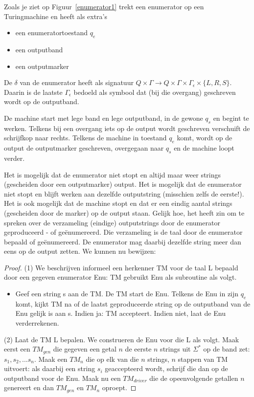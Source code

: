 Zoals je ziet op Figuur~\ref{enumerator1} trekt een enumerator op een
Turingmachine en heeft als extra's
\begin{itemize}
\item een enumeratortoestand $q_e$
\item een outputband
\item een outputmarker
\end{itemize}
De $\delta$ van de enumerator heeft als signatuur 
%
$Q \times \Gamma \rightarrow Q \times \Gamma \times \Gamma_\epsilon \times \{L,R,S\}$.
Daarin is de laatste $\Gamma_\epsilon$ bedoeld als symbool dat (bij die
overgang) geschreven wordt op de outputband.


De machine start met lege band en lege outputband, in de gewone $q_s$ en
begint te werken. Telkens bij een overgang iets op de output wordt
geschreven verschuift de schrijfkop naar rechts. Telkens de machine in
toestand $q_e$ komt, wordt op de output de outputmarker geschreven,
overgegaan naar $q_s$ en de machine loopt verder.


Het is mogelijk dat de enumerator niet stopt en altijd maar weer
strings (gescheiden door een outputmarker) output. Het is mogelijk dat
de enumerator niet stopt en blijft werken aan dezelfde
outputstring (misschien zelfs de eerste!). Het is ook mogelijk dat de
machine stopt en dat er een eindig aantal strings (gescheiden door de
marker) op de output staan.  Gelijk hoe, het heeft zin om te spreken
over de verzameling (eindige) outputstrings door de enumerator
geproduceerd - of ge\"enumereerd. Die verzameling is de taal door de
enumerator bepaald of ge\"enumereerd. De enumerator mag daarbij dezelfde
string meer dan eens op de output zetten. 
We kunnen nu bewijzen:

\begin{proof}
(1) We beschrijven informeel een herkenner TM voor de taal L bepaald
door een gegeven enumerator Enu: TM gebruikt Enu als subroutine als
volgt.
\begin{itemize}
\item[]
Geef een string s aan de TM. De TM start de Enu. Telkens de Enu in
zijn $q_e$ komt, kijkt TM na of de laatst geproduceerde string op de
outputband van de Enu gelijk is aan s. Indien ja: TM
accepteert. Indien niet, laat de Enu verderrekenen.
\end{itemize}

(2) Laat de TM L bepalen. We construeren de Enu voor die L als
    volgt. Maak eerst een $TM_{gen}$ die gegeven een getal $n$ de
    eerste $n$ strings uit $\Sigma^*$ op de band zet: $s_1, s_2,
    ... s_n$. Maak een $TM_n$ die op elk van die $n$ strings, $n$
    stappen van TM uitvoert: als daarbij een string $s_i$ geaccepteerd
    wordt, schrijf die dan op de outputband voor de Enu. Maak nu een
    $TM_{driver}$ die de opeenvolgende getallen $n$ genereert en dan
    $TM_{gen}$ en $TM_n$ oproept.

\end{proof}


